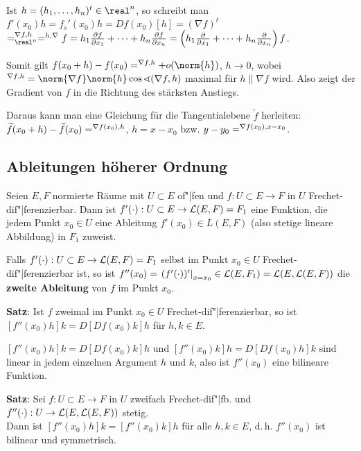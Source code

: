 Ist $h = (h_1, \dotsc, h_n)^t \in \real^n$, so schreibt man
$f'(x_0)h = f_s'(x_0)h = Df(x_0)[h] =
(\nabla f)^t$ 
$= \sp{\nabla f, h}_{\real^n} = \sp{h, \nabla} f =
h_1 \frac{\partial f}{\partial x_1} + \dotsb +
h_n \frac{\partial f}{\partial x_n} =
\left(h_1 \frac{\partial}{\partial x_1} + \dotsb +
h_n \frac{\partial}{\partial x_n}\right) f$.

Somit gilt $f(x_0 + h) - f(x_0) = \sp{\nabla f, h} + o(\norm{h})$, $h \to 0$,
wobei $\sp{\nabla f, h} =
\norm{\nabla f} \norm{h} \cos \sphericalangle(\nabla f, h)$ maximal für
$h \parallel \nabla f$ wird.
Also zeigt der Gradient von $f$ in die Richtung des stärksten Anstiegs.

Daraus kann man eine Gleichung für die Tangentialebene $\widetilde{f}$
herleiten: \\
$\widetilde{f}(x_0 + h) - \widetilde{f}(x_0) = \sp{\nabla f(x_0), h}$,
$h = x - x_0$ bzw.
$y - y_0 = \sp{\nabla f(x_0), x - x_0}$.

\subsection{%
    Ableitungen höherer Ordnung%
}

Seien $E, F$ normierte Räume mit $U \subset E$ of"|fen und
$f: U \subset E \rightarrow F$ in $U$ Frechet-dif"|ferenzierbar.
Dann ist $f'(\cdot): U \subset E \rightarrow \mathcal{L}(E, F) = F_1$ eine Funktion,
die jedem Punkt $x_0 \in U$ eine Ableitung $f'(x_0) \in L(E, F)$
(also stetige lineare Abbildung) in $F_1$ zuweist.

Falls $f'(\cdot): U \subset E \rightarrow \mathcal{L}(E, F) = F_1$ selbst im
Punkt $x_0 \in U$ Frechet-dif"|ferenzierbar ist, so ist
$f''(x_0) = \left.(f'(\cdot))'\right|_{x=x_0} \in \mathcal{L}(E, F_1) = \mathcal{L}(E, \mathcal{L}(E, F))$
die \textbf{zweite Ableitung} von $f$ im Punkt $x_0$.

\linie

\textbf{Satz}:
Ist $f$ zweimal im Punkt $x_0 \in U$ Frechet-dif"|ferenzierbar, so ist
$[f''(x_0)h]k = D[Df(x_0)k]h$ für $h, k \in E$.

$[f''(x_0)h]k = D[Df(x_0)k]h$ und $[f''(x_0)k]h = D[Df(x_0)h]k$
sind linear in jedem einzelnen Argument $h$ und $k$, also ist
$f''(x_0)$ eine bilineare Funktion.

\textbf{Satz}:
Sei $f: U \subset E \rightarrow F$ in $U$ zweifach Frechet-dif"|fb.
und $f''(\cdot): U \rightarrow \mathcal{L}(E, \mathcal{L}(E, F))$ stetig. \\
Dann ist $[f''(x_0)h]k = [f''(x_0)k]h$ für alle $h, k \in E$, d.\,h.
$f''(x_0)$ ist bilinear und symmetrisch.

